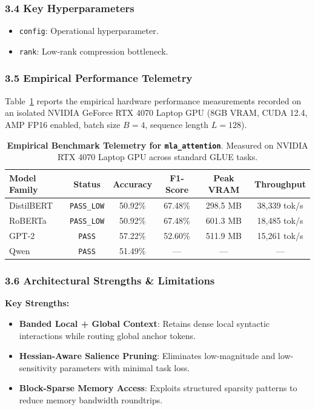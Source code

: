 \subsubsection*{3.4 Key Hyperparameters}
\begin{itemize}
    \item \texttt{config}: Operational hyperparameter.
    \item \texttt{rank}: Low-rank compression bottleneck.
\end{itemize}

\subsubsection*{3.5 Empirical Performance Telemetry}
Table~\ref{tab:telemetry_mla_attention} reports the empirical hardware performance measurements recorded on an isolated NVIDIA GeForce RTX 4070 Laptop GPU (8GB VRAM, CUDA 12.4, AMP FP16 enabled, batch size $B=4$, sequence length $L=128$).

\begin{table}[h]
\centering
\small
\caption{\textbf{Empirical Benchmark Telemetry for \texttt{mla\_attention}}. Measured on NVIDIA RTX 4070 Laptop GPU across standard GLUE tasks.}
\label{tab:telemetry_mla_attention}
\begin{tabular*}{\columnwidth}{@{\extracolsep{\fill}}lccccc}
\toprule
\textbf{Model Family} & \textbf{Status} & \textbf{Accuracy} & \textbf{F1-Score} & \textbf{Peak VRAM} & \textbf{Throughput} \\
\midrule
DistilBERT & \texttt{PASS\_LOW} & 50.92\% & 67.48\% & 298.5 MB & 38,339 tok/s \\
RoBERTa & \texttt{PASS\_LOW} & 50.92\% & 67.48\% & 601.3 MB & 18,485 tok/s \\
GPT-2 & \texttt{PASS} & 57.22\% & 52.60\% & 511.9 MB & 15,261 tok/s \\
Qwen & \texttt{PASS} & 51.49\% & --- & --- & --- \\
\bottomrule
\end{tabular*}
\end{table}

\subsubsection*{3.6 Architectural Strengths \& Limitations}
\textbf{Key Strengths:}
\begin{itemize}
    \item \textbf{Banded Local + Global Context}: Retains dense local syntactic interactions while routing global anchor tokens.
    \item \textbf{Hessian-Aware Salience Pruning}: Eliminates low-magnitude and low-sensitivity parameters with minimal task loss.
    \item \textbf{Block-Sparse Memory Access}: Exploits structured sparsity patterns to reduce memory bandwidth roundtrips.
\end{itemize}

